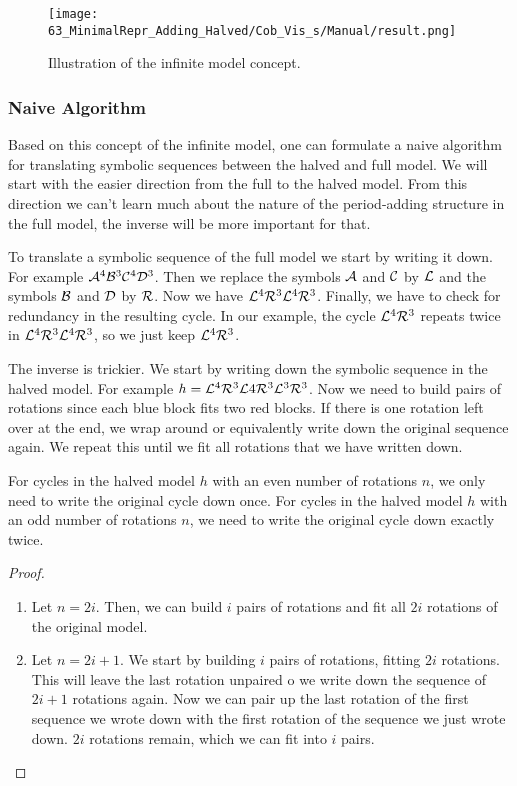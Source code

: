 \begin{figure}
	\centering
	\texttt{[image: 63\_MinimalRepr\_Adding\_Halved/Cob\_Vis\_s/Manual/result.png]}
	\caption{Illustration of the infinite model concept.}
	\label{fig:minrep.infinite.model.concept}
\end{figure}

\subsubsection{Naive Algorithm}

Based on this concept of the infinite model, one can formulate a naive algorithm for translating symbolic sequences between the halved and full model.
We will start with the easier direction from the full to the halved model.
From this direction we can't learn much about the nature of the period-adding structure in the full model, the inverse will be more important for that.

To translate a symbolic sequence of the full model we start by writing it down.
For example $\mathcal{A}^4\mathcal{B}^3\mathcal{C}^4\mathcal{D}^3$.
Then we replace the symbols $\mathcal{A}$ and $\mathcal{C}$ by $\mathcal{L}$ and the symbols $\mathcal{B}$ and $\mathcal{D}$ by $\mathcal{R}$.
Now we have $\mathcal{L}^4\mathcal{R}^3\mathcal{L}^4\mathcal{R}^3$.
Finally, we have to check for redundancy in the resulting cycle.
In our example, the cycle $\mathcal{L}^4\mathcal{R}^3$ repeats twice in $\mathcal{L}^4\mathcal{R}^3\mathcal{L}^4\mathcal{R}^3$, so we just keep $\mathcal{L}^4\mathcal{R}^3$.

The inverse is trickier.
We start by writing down the symbolic sequence in the halved model.
For example $h = \mathcal{L}^4\mathcal{R}^3\mathcal{L}4\mathcal{R}^3\mathcal{L}^3\mathcal{R}^3$.
Now we need to build pairs of rotations since each blue block fits two red blocks.
If there is one rotation left over at the end, we wrap around or equivalently write down the original sequence again.
We repeat this until we fit all rotations that we have written down.

\begin{lemma}
	\label{lemma:writing.down}
	For cycles in the halved model $h$ with an even number of rotations $n$, we only need to write the original cycle down once.
	For cycles in the halved model $h$ with an odd number of rotations $n$, we need to write the original cycle down exactly twice.
\end{lemma}

\begin{proof} \phantom{x}
	\begin{enumerate}
		\item Let $n = 2i$. Then, we can build $i$ pairs of rotations and fit all $2i$ rotations of the original model.
		\item Let $n = 2i + 1$. We start by building $i$ pairs of rotations, fitting $2i$ rotations.
		      This will leave the last rotation unpaired o we write down the sequence of $2i + 1$ rotations again.
		      Now we can pair up the last rotation of the first sequence we wrote down with the first rotation of the sequence we just wrote down.
		      $2i$ rotations remain, which we can fit into $i$ pairs.
	\end{enumerate}
\end{proof}

